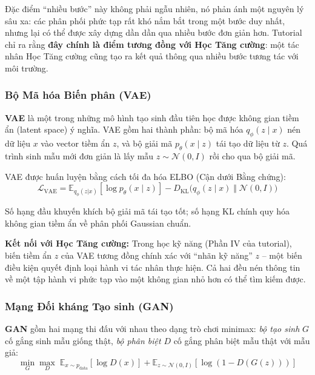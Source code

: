 Đặc điểm ``nhiều bước'' này không phải ngẫu nhiên, nó phản ánh một
nguyên lý sâu xa: các phân phối phức tạp rất khó nắm bắt trong một
bước duy nhất, nhưng lại có thể được xây dựng dần dần qua nhiều bước
đơn giản hơn. Tutorial chỉ ra rằng \textbf{đây chính là điểm tương
đồng với Học Tăng cường}: một tác nhân Học Tăng cường cũng tạo ra kết quả thông qua nhiều bước
tương tác với môi trường.

\subsubsection{Bộ Mã hóa Biến phân (VAE)}

\textbf{VAE} là một trong những mô hình tạo sinh đầu tiên học được
không gian tiềm ẩn (latent space) ý nghĩa. VAE gồm hai thành phần:
bộ mã hóa $q_\phi(z \mid x)$ nén dữ liệu $x$ vào vector tiềm ẩn $z$,
và bộ giải mã $p_\theta(x \mid z)$ tái tạo dữ liệu từ $z$. Quá trình
sinh mẫu mới đơn giản là lấy mẫu $z \sim \mathcal{N}(0, I)$ rồi
cho qua bộ giải mã.

VAE được huấn luyện bằng cách tối đa hóa ELBO (Cận dưới Bằng chứng):
\begin{equation}
    \mathcal{L}_{\text{VAE}} = \mathbb{E}_{q_\phi(z|x)}
    [\log p_\theta(x \mid z)]
    - D_{\text{KL}}\bigl(q_\phi(z \mid x) \;\Vert\; \mathcal{N}(0,I)\bigr)
    \label{eq:vae_elbo}
\end{equation}

Số hạng đầu khuyến khích bộ giải mã tái tạo tốt; số hạng KL
chính quy hóa không gian tiềm ẩn về phân phối Gaussian chuẩn.

\textbf{Kết nối với Học Tăng cường:} Trong học kỹ năng (Phần IV của tutorial),
biến tiềm ẩn $z$ của VAE tương đồng chính xác với ``nhãn kỹ năng'' $z$
-- một biến điều kiện quyết định loại hành vi tác nhân thực hiện. Cả hai
đều nén thông tin về một tập hành vi phức tạp vào một không gian nhỏ
hơn có thể tìm kiếm được.

\subsubsection{Mạng Đối kháng Tạo sinh (GAN)}

\textbf{GAN} gồm hai mạng thi đấu với nhau theo dạng trò chơi
minimax: \textit{bộ tạo sinh} $G$ cố gắng sinh mẫu giống thật,
\textit{bộ phân biệt} $D$ cố gắng phân biệt mẫu thật với mẫu giả:
\begin{equation}
    \min_G \max_D \; \mathbb{E}_{x \sim p_{\text{data}}}[\log D(x)]
    + \mathbb{E}_{z \sim \mathcal{N}(0,I)}[\log(1 - D(G(z)))]
    \label{eq:gan}
\end{equation}

